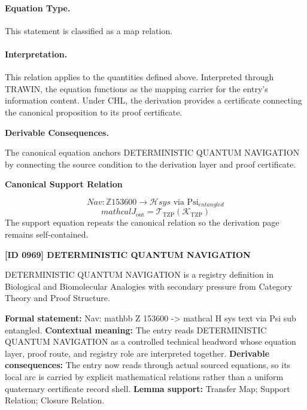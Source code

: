 \paragraph{Equation Type.}
This statement is classified as a map relation.

\paragraph{Interpretation.}
This relation applies to the quantities defined above. Interpreted through TRAWIN, the equation functions as the mapping carrier for the entry’s information content. Under CHL, the derivation provides a certificate connecting the canonical proposition to its proof certificate.

\par\vspace{0.35em}
\noindent\textbf{Derivable Consequences.}\quad
\begingroup
\footnotesize
\raggedright
The canonical equation anchors DETERMINISTIC QUANTUM NAVIGATION by connecting the source condition to the derivation layer and proof certificate.
\par\endgroup

\noindent\textbf{Canonical Support Relation}\par
\[
Nav: \mathbb{Z} {153600} \to \mathcal{H} {sys} \text{ via } \mathrm{Psi}_{entangled}
\]
\[
mathcal{J}_{\mathrm{out}} = \mathcal{T}_{\mathrm{TZP}}\!\left(\mathcal{K}_{\mathrm{TZP}}\right)
\]
\noindent The support equation repeats the canonical relation so the derivation page remains self-contained.\par

\clearpage
\noindent\textbf{[ID 0969] DETERMINISTIC QUANTUM NAVIGATION}\par
\vspace{0.35em}
\begingroup\small
{}
DETERMINISTIC QUANTUM NAVIGATION is a registry definition in Biological and Biomolecular Analogies with secondary pressure from Category Theory and Proof Structure.

\begingroup\footnotesize\setlength{\emergencystretch}{3em}\sloppy
\textbf{Formal statement:} Nav: mathbb Z 153600 -> mathcal H sys text via Psi sub entangled. \textbf{Contextual meaning:} The entry reads DETERMINISTIC QUANTUM NAVIGATION as a controlled technical headword whose equation layer, proof route, and registry role are interpreted together. \textbf{Derivable consequences:} The entry now reads through actual sourced equations, so its local arc is carried by explicit mathematical relations rather than a uniform quaternary certificate record shell. \textbf{Lemma support:} Transfer Map; Support Relation; Closure Relation.\par
\endgroup

